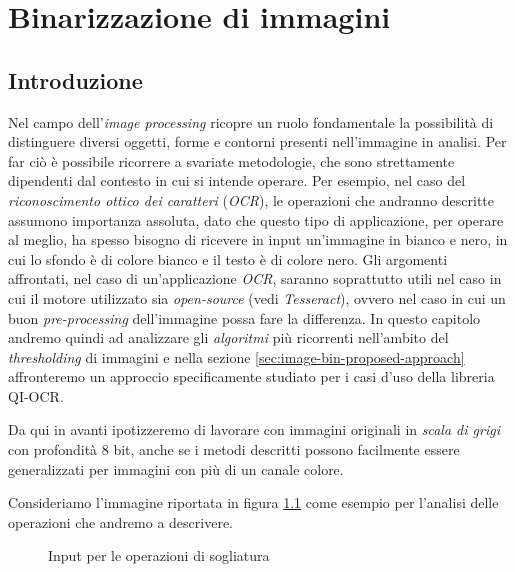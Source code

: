 \chapter{Binarizzazione di immagini}
\label{chap:image-binarization}


\section{Introduzione}
\label{sec:image-bin-intro}
Nel campo dell'\textit{image processing} ricopre un ruolo fondamentale la possibilit\`a di distinguere diversi oggetti, forme e contorni presenti nell'immagine in analisi. Per far ci\`o \`e possibile ricorrere a svariate metodologie, che sono strettamente dipendenti dal contesto in cui si intende operare. Per esempio, nel caso del \textit{riconoscimento ottico dei caratteri} (\textit{OCR}), le operazioni che andranno descritte assumono importanza assoluta, dato che questo tipo di applicazione, per operare al meglio, ha spesso bisogno di ricevere in input un'immagine in bianco e nero, in cui lo sfondo \`e di colore bianco e il testo \`e di colore nero. Gli argomenti affrontati, nel caso di un'applicazione \textit{OCR}, saranno soprattutto utili nel caso in cui il motore utilizzato sia \textit{open-source} (vedi \textit{Tesseract}), ovvero nel caso in cui un buon \textit{pre-processing} dell'immagine possa fare la differenza. In questo capitolo andremo quindi ad analizzare gli \textit{algoritmi} pi\`u ricorrenti nell'ambito del \textit{thresholding} di immagini e nella sezione \ref{sec:image-bin-proposed-approach} affronteremo un approccio specificamente studiato per i casi d'uso della libreria QI-OCR.\par
Da qui in avanti ipotizzeremo di lavorare con immagini originali in \textit{scala di grigi} con profondit\`a 8 bit, anche se i metodi descritti possono facilmente essere generalizzati per immagini con pi\`u di un canale colore.\par
Consideriamo l'immagine riportata in figura \ref{fig:image-bin-input} come esempio per l'analisi delle operazioni che andremo a descrivere.
\begin{figure}[h]
	\centering
	\caption{Input per le operazioni di sogliatura}
	\label{fig:image-bin-input}
\end{figure}


